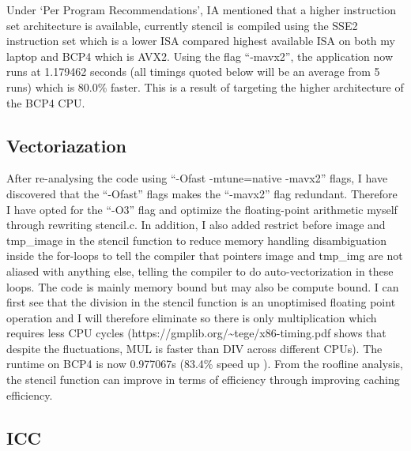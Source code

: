 \documentclass{article}
\begin{document}
Under `Per Program Recommendations', IA mentioned that a higher
instruction set architecture is available, currently stencil is compiled
using the SSE2 instruction set which is a lower ISA compared highest
available ISA on both my laptop and BCP4 which is AVX2. Using the flag
``-mavx2'', the application now runs at 1.179462 seconds (all timings
quoted below will be an average from 5 runs) which is 80.0\% faster. This is
a result of targeting the higher architecture of the BCP4 CPU.

\subsection{Vectoriazation}

After re-analysing the code using ``-Ofast -mtune=native -mavx2'' flags,
I have discovered that the ``-Ofast'' flags makes the ``-mavx2'' flag
redundant. Therefore I have opted for the ``-O3'' flag and optimize the
floating-point arithmetic myself through rewriting stencil.c. In
addition, I also added restrict before image and tmp\_image in the
stencil function to reduce memory handling disambiguation inside the
for-loops to tell the compiler that pointers image and tmp\_img are not
aliased with anything else, telling the compiler to do
auto-vectorization in these loops. The code is mainly memory bound but
may also be compute bound. I can first see that the division in the
stencil function is an unoptimised floating point operation and I will
therefore eliminate so there is only multiplication which requires less
CPU cycles (https://gmplib.org/\textasciitilde{}tege/x86-timing.pdf
shows that despite the fluctuations, MUL is faster than DIV across
different CPUs). The runtime on BCP4 is now 0.977067s (83.4\% speed up
). From the roofline analysis, the stencil function can improve in terms of
efficiency through improving caching efficiency.

\subsection{ICC}
\end{document}
